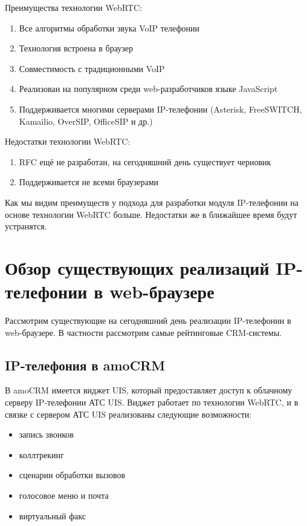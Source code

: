 Преимущества технологии WebRTC:
\begin{enumerate}
\item Все алгоритмы обработки звука VoIP телефонии
\item Технология встроена в браузер
\item Совместимость с традиционными VoIP
\item Реализован на популярном среди web-разработчиков языке JavaScript
\item Поддерживается многими серверами IP-телефонии (Asterisk, FreeSWITCH, Kamailio, OverSIP, OfficeSIP и др.)
\end{enumerate}

Недостатки технологии WebRTC:
\begin{enumerate}
\item RFC ещё не разработан, на сегодняшний день существует черновик\cite{WebRTC_W3C}
\item Поддерживается не всеми браузерами
\end{enumerate}

Как мы видим преимуществ у подхода для разработки модуля IP-телефонии на основе технологии WebRTC больше. Недостатки же в ближайшее время будут устранятся.

\section{Обзор существующих реализаций IP-телефонии в web-браузере}

Рассмотрим существующие на сегодняшний день реализации IP-телефонии в web-браузере. В частности рассмотрим самые рейтинговые CRM-системы.\cite{bestCRMs}

\subsection{IP-телефония в amoCRM}

В amoCRM имеется виджет UIS, который предоставляет доступ к облачному серверу IP-телефонии АТС UIS. Виджет работает по технологии WebRTC, и в связке с сервером АТС UIS реализованы следующие возможности\cite{amoCRM}:
\begin{itemize}
\item запись звонков
\item коллтрекинг
\item сценарии обработки вызовов
\item голосовое меню и почта
\item виртуальный факс
\end{itemize}


